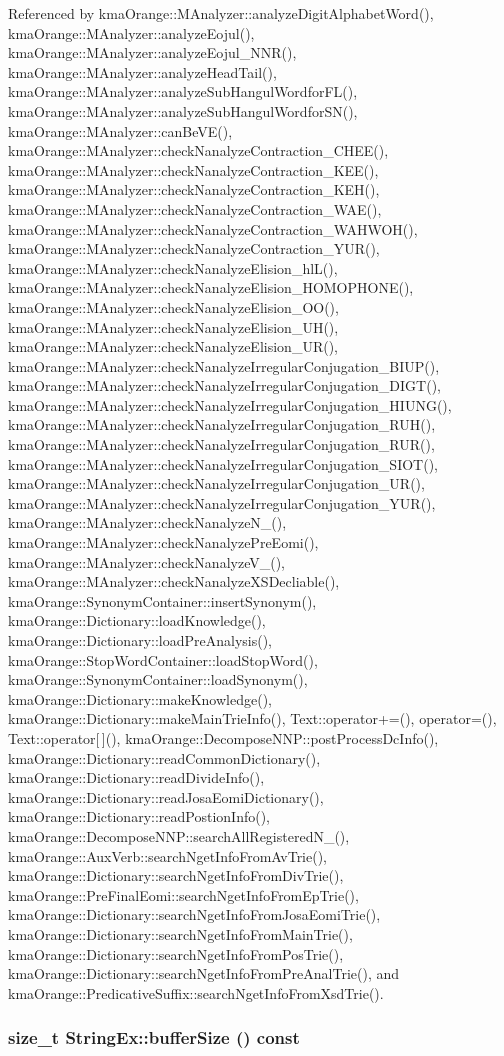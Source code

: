 Referenced by kmaOrange::MAnalyzer::analyzeDigitAlphabetWord(), kmaOrange::MAnalyzer::analyzeEojul(), kmaOrange::MAnalyzer::analyzeEojul\_\-NNR(), kmaOrange::MAnalyzer::analyzeHeadTail(), kmaOrange::MAnalyzer::analyzeSubHangulWordforFL(), kmaOrange::MAnalyzer::analyzeSubHangulWordforSN(), kmaOrange::MAnalyzer::canBeVE(), kmaOrange::MAnalyzer::checkNanalyzeContraction\_\-CHEE(), kmaOrange::MAnalyzer::checkNanalyzeContraction\_\-KEE(), kmaOrange::MAnalyzer::checkNanalyzeContraction\_\-KEH(), kmaOrange::MAnalyzer::checkNanalyzeContraction\_\-WAE(), kmaOrange::MAnalyzer::checkNanalyzeContraction\_\-WAHWOH(), kmaOrange::MAnalyzer::checkNanalyzeContraction\_\-YUR(), kmaOrange::MAnalyzer::checkNanalyzeElision\_\-hlL(), kmaOrange::MAnalyzer::checkNanalyzeElision\_\-HOMOPHONE(), kmaOrange::MAnalyzer::checkNanalyzeElision\_\-OO(), kmaOrange::MAnalyzer::checkNanalyzeElision\_\-UH(), kmaOrange::MAnalyzer::checkNanalyzeElision\_\-UR(), kmaOrange::MAnalyzer::checkNanalyzeIrregularConjugation\_\-BIUP(), kmaOrange::MAnalyzer::checkNanalyzeIrregularConjugation\_\-DIGT(), kmaOrange::MAnalyzer::checkNanalyzeIrregularConjugation\_\-HIUNG(), kmaOrange::MAnalyzer::checkNanalyzeIrregularConjugation\_\-RUH(), kmaOrange::MAnalyzer::checkNanalyzeIrregularConjugation\_\-RUR(), kmaOrange::MAnalyzer::checkNanalyzeIrregularConjugation\_\-SIOT(), kmaOrange::MAnalyzer::checkNanalyzeIrregularConjugation\_\-UR(), kmaOrange::MAnalyzer::checkNanalyzeIrregularConjugation\_\-YUR(), kmaOrange::MAnalyzer::checkNanalyzeN\_\-(), kmaOrange::MAnalyzer::checkNanalyzePreEomi(), kmaOrange::MAnalyzer::checkNanalyzeV\_\-(), kmaOrange::MAnalyzer::checkNanalyzeXSDecliable(), kmaOrange::SynonymContainer::insertSynonym(), kmaOrange::Dictionary::loadKnowledge(), kmaOrange::Dictionary::loadPreAnalysis(), kmaOrange::StopWordContainer::loadStopWord(), kmaOrange::SynonymContainer::loadSynonym(), kmaOrange::Dictionary::makeKnowledge(), kmaOrange::Dictionary::makeMainTrieInfo(), Text::operator+=(), operator=(), Text::operator\mbox{[}$\,$\mbox{]}(), kmaOrange::DecomposeNNP::postProcessDcInfo(), kmaOrange::Dictionary::readCommonDictionary(), kmaOrange::Dictionary::readDivideInfo(), kmaOrange::Dictionary::readJosaEomiDictionary(), kmaOrange::Dictionary::readPostionInfo(), kmaOrange::DecomposeNNP::searchAllRegisteredN\_\-(), kmaOrange::AuxVerb::searchNgetInfoFromAvTrie(), kmaOrange::Dictionary::searchNgetInfoFromDivTrie(), kmaOrange::PreFinalEomi::searchNgetInfoFromEpTrie(), kmaOrange::Dictionary::searchNgetInfoFromJosaEomiTrie(), kmaOrange::Dictionary::searchNgetInfoFromMainTrie(), kmaOrange::Dictionary::searchNgetInfoFromPosTrie(), kmaOrange::Dictionary::searchNgetInfoFromPreAnalTrie(), and kmaOrange::PredicativeSuffix::searchNgetInfoFromXsdTrie().\hypertarget{classStringEx_eaf8859daeb95f1380c814740af5b5d4}{
\subsubsection[{bufferSize}]{\setlength{\rightskip}{0pt plus 5cm}size\_\-t StringEx::bufferSize () const}}
\label{classStringEx_eaf8859daeb95f1380c814740af5b5d4}




